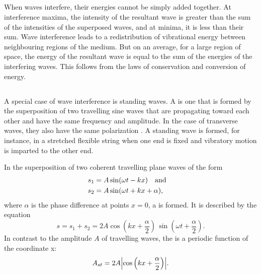 \subsection{}\label{30.5.3} When waves interfere, their energies cannot be simply added together. At interference maxima, the intensity of the resultant wave is greater than the sum of the intensities of the superposed waves, and at minima, it is less than their sum. Wave interference leads to a redistribution of vibrational energy between neighbouring regions of the medium. But on an average, for a large region of space, the energy of the resultant wave is equal to the sum of the energies of the interfering waves. This follows from the laws of conservation and conversion of energy. 

\subsection{}\label{30.5.4} A special case of wave interference is standing waves. A  is one that is formed by the superposition of two travelling sine waves that are propagating toward each other and have the same frequency and amplitude. In the case of transverse waves, they also have the same polarization . A standing wave is formed, for instance, in a stretched flexible string when one end is fixed and vibratory motion is imparted to the other end.

In the superposition of two coherent travelling plane waves of the form
\begin{align*}%
s_{1} & = A \sin (\omega t - kx) \qand \\
s_{2} & = A \sin (\omega t + kx + \alpha),
\end{align*}
where $\alpha$ is the phase difference at points $x = 0$, a  is formed. It is described by the equation
\begin{equation*}%
s = s_{1} + s_{2} = 2A\cos \left(kx + \frac{\alpha}{2} \right) \, \sin \left( \omega t + \frac{\alpha}{2} \right).
\end{equation*}
In contrast to the amplitude $A$ of travelling waves, the  is a periodic function of the coordinate x:
\begin{equation*}%
A_{st} = 2A \abs{\cos \left(kx + \frac{\alpha}{2} \right)}.
\end{equation*}

